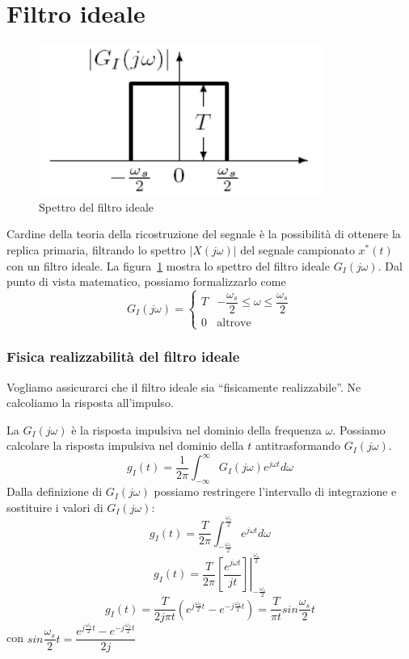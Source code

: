 \documentclass[a4paper]{report}
\begin{document}
\section{Filtro ideale}\label{filtroIdeale}
\begin{figure}[!h]
  \begin{center}
    \includegraphics[scale=0.5]{./figures/filtroIdeale.png}
    \caption{Spettro del filtro ideale}\label{fig:filtroIdeale}
  \end{center}
\end{figure}
Cardine della teoria della ricostruzione del segnale \`e la
possibilit\`a di ottenere la replica primaria, filtrando lo spettro
$|X(j \omega)|$ del segnale campionato $x^{*}(t)$ con un filtro
ideale. La figura~\ref{fig:filtroIdeale} mostra lo spettro del filtro
ideale $G_I(j \omega)$. Dal punto di vista matematico, possiamo
formalizzarlo come
\begin{equation}
  G_I(j \omega) = 
  \left\{
  \begin{array}{ll}
    T & -\dfrac{\omega_s}{2} \leq \omega \leq \dfrac{\omega_s}{2}\\
    0 & \textrm{altrove}
  \end{array}
  \right.
\end{equation}

\subsubsection{Fisica realizzabilit\`a del filtro ideale}
Vogliamo assicurarci che il filtro ideale sia ``fisicamente
realizzabile''. Ne calcoliamo la risposta all'impulso.

La $G_I(j \omega)$ \`e la risposta impulsiva nel dominio della
frequenza $\omega$. Possiamo calcolare la risposta impulsiva nel
dominio della $t$ antitrasformando $G_I(j \omega)$.
\[
g_I(t) = \dfrac{1}{2 \pi} \int_{- \infty}^{\infty} G_I(j \omega) e^{j
  \omega t} d\omega
\]
Dalla definizione di $G_I(j \omega)$ possiamo restringere l'intervallo
di integrazione e sostituire i valori di $G_I(j \omega)$:
\[
g_I(t) = \dfrac{T}{2 \pi} \int_{-\frac{\omega_s}{2}}^{\frac{\omega_s}{2}}e^{j
  \omega t} d\omega
\]
\[
g_I(t) = \dfrac{T}{2 \pi} \left.\left[ \dfrac{e^{j \omega t}}{j
    t}\right]\right|_{-\frac{\omega_s}{2}}^{\frac{\omega_s}{2}} 
\]
\[
g_I(t) = \dfrac{T}{2 j \pi t} \left( e^{j \frac{\omega_2}{2}t} - e^{-j
  \frac{\omega_2}{2}t}\right) = \dfrac{T}{\pi
  t}sin\dfrac{\omega_s}{2}t
\]
con $sin \dfrac{\omega_s}{2}t = \dfrac{e^{j \frac{\omega_2}{2}t} - e^{-j
  \frac{\omega_2}{2}t}}{2j}$
\end{document}
